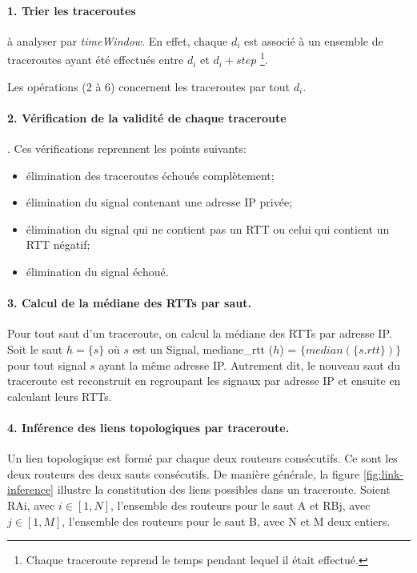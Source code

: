 \paragraph{1. Trier les traceroutes } à analyser par \textit{timeWindow}. En effet, chaque $d_i$ est associé à un ensemble de traceroutes ayant été effectués entre $d_i$ et $d_i + step$ \footnote{Chaque traceroute reprend le temps pendant lequel il était effectué.}. 




Les opérations  (2 à 6) concernent  les traceroutes par tout $d_i$.  

\paragraph{2. Vérification de la validité de chaque traceroute }. Ces vérifications reprennent les points suivants:
\begin{itemize}
	\item élimination des traceroutes échoués complètement;
	\item élimination du signal contenant une adresse IP privée;
	\item élimination du signal qui ne contient pas un RTT ou celui qui contient un RTT négatif;
	\item  élimination du signal échoué.
\end{itemize}

\paragraph{3. Calcul de la médiane des RTTs par saut.} Pour tout saut d'un traceroute,  on calcul la médiane des RTTs par adresse IP. Soit le saut $h =\{s \}$ où $s$ est un  Signal, mediane\_rtt ($h$) =  $\{median(\{s.rtt\})\}$  pour tout signal $s$ ayant la même adresse IP. Autrement dit, le nouveau saut du traceroute est reconstruit en regroupant les signaux par adresse IP et ensuite en calculant leurs RTTs. 




\paragraph{4. Inférence des liens topologiques par traceroute.} Un lien topologique est formé par chaque deux routeurs consécutifs. Ce sont les deux routeurs des deux sauts consécutifs. De manière générale, la figure \ref{fig:link-inference} illustre la constitution des liens possibles  dans un traceroute. Soient  RAi, avec $i \in [1,N]$,  l'ensemble des routeurs pour le saut A et RBj, avec $j \in [1,M]$, l'ensemble  des routeurs pour le saut B, avec N et M deux entiers.



